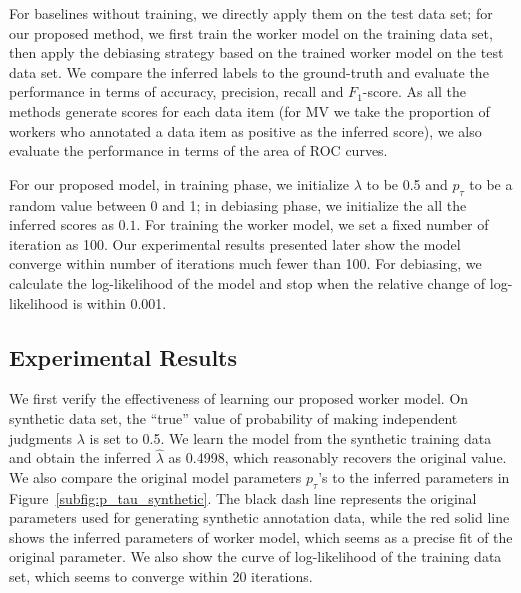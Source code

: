 For baselines without training, we directly apply them on the test data set; 
for our proposed method, we first train the worker model on the training data set, 
then apply the debiasing strategy based on the trained worker model on the test data set.  
We compare the inferred labels to the ground-truth and evaluate the performance in terms of accuracy, precision, recall and $F_1$-score.  
As all the methods generate scores for each data item 
(for MV we take the proportion of workers who annotated a data item as positive as the inferred score),
we also evaluate the performance in terms of the area of ROC curves.  


For our proposed model, 
in training phase, we initialize $\lambda$ to be 0.5 and $p_{\tau}$ to be a random value between 0 and 1;
in debiasing phase, we initialize the all the inferred scores as $0.1$. 
For training the worker model, we set a fixed number of iteration as 100.  
Our experimental results presented later show the model converge within number of iterations much fewer than 100.  
For debiasing, we calculate the log-likelihood of the model and stop when the relative change of log-likelihood is within 0.001.  


\subsection{Experimental Results}


We first verify the effectiveness of learning our proposed worker model.  
On synthetic data set, the ``true'' value of probability of making independent judgments $\lambda$ is set to 0.5.  
We learn the model from the synthetic training data and obtain the inferred $\hat{\lambda}$ as 0.4998, 
which reasonably recovers the original value.  
We also compare the original model parameters $p_{\tau}$'s to the inferred parameters in Figure~\ref{subfig:p_tau_synthetic}.  
The black dash line represents the original parameters used for generating synthetic annotation data, 
while the red solid line shows the inferred parameters of worker model, 
which seems as a precise fit of the original parameter.  
We also show the curve of log-likelihood of the training data set,
which seems to converge within 20 iterations.  

